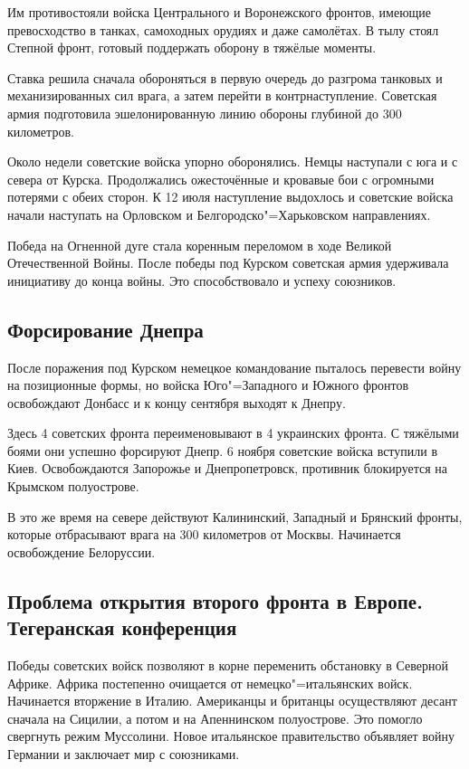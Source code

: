 Им противостояли войска Центрального и Воронежского фронтов, имеющие превосходство в танках, самоходных орудиях и даже самолётах. В тылу стоял Степной фронт, готовый поддержать оборону в тяжёлые моменты.

Ставка решила сначала обороняться в первую очередь до разгрома танковых и механизированных сил врага, а затем перейти в контрнаступление. Советская армия подготовила эшелонированную линию обороны глубиной до 300 километров.

Около недели советские войска упорно оборонялись. Немцы наступали с юга и с севера от Курска. Продолжались ожесточённые и кровавые бои с огромными потерями с обеих сторон. К 12 июля наступление выдохлось и советские войска начали наступать на Орловском и Белгородско"=Харьковском направлениях.

Победа на Огненной дуге стала коренным переломом в ходе Великой Отечественной Войны. После победы под Курском советская армия удерживала инициативу до конца войны. Это способствовало и успеху союзников.

\subsection{Форсирование Днепра}

После поражения под Курском немецкое командование пыталось перевести войну на позиционные формы, но  войска Юго"=Западного и Южного фронтов освобождают Донбасс и к концу сентября выходят к Днепру.

Здесь 4 советских фронта переименовывают в 4 украинских фронта. С тяжёлыми боями они успешно форсируют Днепр. 6 ноября советские войска вступили в Киев. Освобождаются Запорожье и Днепропетровск, противник блокируется на Крымском полуострове.

В это же время на севере действуют Калининский, Западный и Брянский фронты, которые отбрасывают врага на 300 километров от Москвы. Начинается освобождение Белоруссии.

\subsection{Проблема открытия второго фронта в Европе. Тегеранская конференция}

Победы советских войск позволяют в корне переменить обстановку в Северной Африке. Африка постепенно очищается от немецко"=итальянских войск. Начинается вторжение в Италию. Американцы и британцы осуществляют десант сначала на Сицилии, а потом и на Апеннинском полуострове. Это помогло свергнуть режим Муссолини. Новое итальянское правительство объявляет войну Германии и заключает мир с союзниками.

